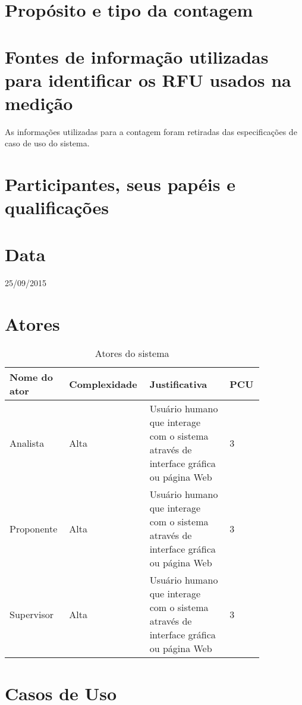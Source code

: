 \section{Propósito e tipo da contagem}

\section{Fontes de informação utilizadas para identificar os RFU usados na medição}
As informações utilizadas para a contagem foram retiradas das especificações de caso de uso do sistema.

\section{Participantes, seus papéis e qualificações}

\section{Data}
25/09/2015

\section{Atores}

\begin{table*}[!h]
\centering
\caption{Atores do sistema}
\label{Rotulo}
  \begin{tabular}{|p{0.20\linewidth}|p{0.25\linewidth}|p{0.30\linewidth}|p{0.10\linewidth}|}
  \hline
  \textbf{Nome do ator} & \textbf{Complexidade} & \textbf{Justificativa} & \textbf{PCU} \\ 
  \hline

  Analista & Alta & Usuário humano que interage com o sistema através de interface gráfica ou página Web& 3 \\
  \hline
  Proponente & Alta & Usuário humano que interage com o sistema através de interface gráfica ou página Web& 3\\
  \hline
  Supervisor & Alta & Usuário humano que interage com o sistema através de interface gráfica ou página Web& 3\\
  \hline
  \end{tabular}
\end{table*}

\section{Casos de Uso}
  
